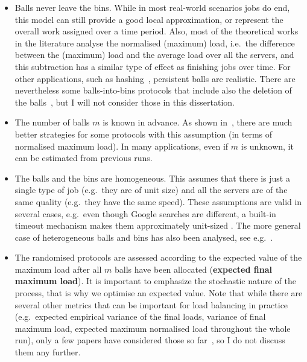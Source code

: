 \begin{itemize}
    \item
    Balls never leave the bins. While in most real-world scenarios jobs do end, this model can still provide a good local approximation, or represent the overall work assigned over a time period. Also, most of the theoretical works in the literature analyse the normalised (maximum) load, i.e.\ the difference between the (maximum) load and the average load over all the servers, and this subtraction has a similar type of effect as finishing jobs over time. For other applications, such as hashing~\cite{wieder2017ballsintobinslandscape}, persistent balls are realistic. There are nevertheless some balls-into-bins protocols that include also the deletion of the balls~\cite{azar1999twochoice}, but I will not consider those in this dissertation.
    \item
    The number of balls $m$ is known in advance. As shown in~\cite{feldheim2021longtermthinning}, there are much better strategies for some protocols with this assumption (in terms of normalised maximum load). In many applications, even if $m$ is unknown, it can be estimated from previous runs.
    \item
    The balls and the bins are homogeneous. This assumes that there is just a single type of job (e.g.\ they are of unit size) and all the servers are of the same quality (e.g.\ they have the same speed). These assumptions are valid in several cases, e.g.\ even though Google searches are different, a built-in timeout mechanism makes them approximately unit-sized . The more general case of heterogeneous balls and bins has also been analysed, see e.g.~\cite{berenbrink2008weighted}.
    \item
    The randomised protocols are assessed according to the expected value of the maximum load after all $m$ balls have been allocated (\textbf{expected final maximum load}). It is important to emphasize the stochastic nature of the process, that is why we optimise an expected value. Note that while there are several other metrics that can be important for load balancing in practice (e.g.\ expected empirical variance of the final loads, variance of final maximum load, expected maximum normalised load throughout the whole run), only a few papers have considered those so far~\cite{feldheim2021longtermthinning}, so I do not discuss them any further. 
    
\end{itemize}





